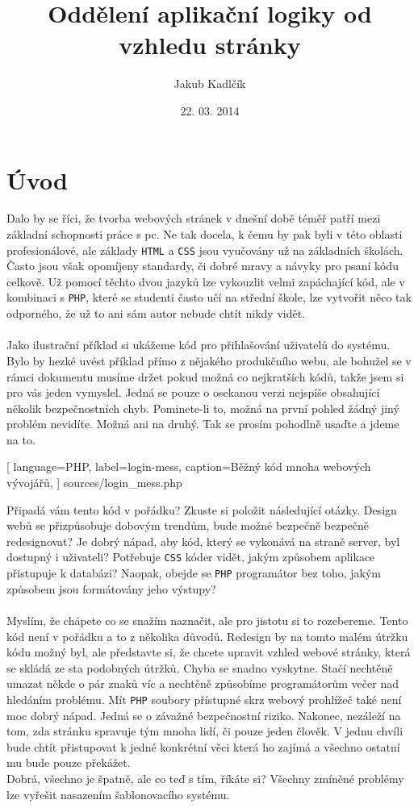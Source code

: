 \documentclass[10pt,a4paper]{article}
\title{Oddělení aplikační logiky od vzhledu stránky}
\author{Jakub Kadlčík}
\date{22. 03. 2014}
\begin{document}
	\maketitle
	\newpage
	
	\tableofcontents
	\newpage
	
	\section{Úvod}
	\label{uvod}
	Dalo by se říci, že tvorba webových stránek v dnešní době téměř patří mezi základní schopnosti práce s pc. Ne tak docela, k čemu by pak byli v této oblasti profesionálové, ale základy \texttt{HTML} a \texttt{CSS} jsou vyučovány už na základních školách. Často jsou však opomíjeny standardy, či dobré mravy a návyky pro psaní kódu celkově. Už pomocí těchto dvou jazyků lze vykouzlit velmi zapáchající kód, ale v kombinaci s \texttt{PHP}, které se studenti často učí na střední škole, lze vytvořit něco tak odporného, že už to ani sám autor nebude chtít nikdy vidět.
	\\
	\\
	Jako ilustrační příklad si ukážeme kód pro přihlašování uživatelů do systému. Bylo by hezké uvést příklad přímo z nějakého produkčního webu, ale bohužel se v rámci dokumentu musíme držet pokud možná co nejkratších kódů, takže jsem si pro vás jeden vymyslel. Jedná se pouze o osekanou verzi nejspíše obsahující několik bezpečnostních chyb. Pominete-li to, možná na první pohled žádný jiný problém nevidíte. Možná ani na druhý. Tak se prosím pohodlně usaďte a jdeme na to.
	
	
	[
		language=PHP,
		label=login-mess,
		caption={Běžný kód mnoha webových vývojářů},
	] {sources/login_mess.php}
	\vspace{10pt}
	
	Připadá vám tento kód v pořádku? Zkuste si položit následující otázky. Design webů se přizpůsobuje dobovým trendům, bude možné bezpečně bezpečně redesignovat? Je dobrý nápad, aby kód, který se vykonává na straně server, byl dostupný i uživateli? Potřebuje \texttt{CSS} kóder vidět, jakým způsobem aplikace přistupuje k databázi? Naopak, obejde se \texttt{PHP} programátor bez toho, jakým způsobem jsou formátovány jeho výstupy?
	\\
	\\
	Myslím, že chápete co se snažím naznačit, ale pro jistotu si to rozebereme. Tento kód není v pořádku a to z několika důvodů. Redesign by na tomto malém útržku kódu možný byl, ale představte si, že chcete upravit vzhled webové stránky, která se skládá ze sta podobných útržků. Chyba se snadno vyskytne. Stačí nechtěně umazat někde o pár znaků víc a nechtěně způsobíme programátorům  večer nad hledáním problému. Mít \texttt{PHP} soubory přístupné skrz webový prohlížeč také není moc dobrý nápad. Jedná se o závažné bezpečnostní riziko. Nakonec, nezáleží na tom, zda stránku spravuje tým mnoha lidí, či pouze jeden člověk. V jednu chvíli bude chtít přistupovat k jedné konkrétní věci která ho zajímá a všechno ostatní mu bude pouze překážet.
	\\ Dobrá, všechno je špatně, ale co teď s tím, říkáte si? Všechny zmíněné problémy lze vyřešit nasazením šablonovacího systému.
\end{document}
